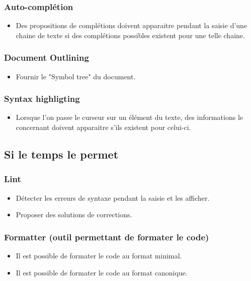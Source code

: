 \documentclass[
    iict, %
    il, %
]{heig-tb}
\begin{document}
\subsubsection*{Auto-complétion}
\begin{itemize}
    \item Des propositions de complétions doivent apparaitre pendant la saisie d’une chaine de texte si des complétions possibles existent pour une telle chaine.
\end{itemize}

\subsubsection*{Document Outlining}
\begin{itemize}
    \item Fournir le "Symbol tree" du document.
\end{itemize}

\subsubsection*{Syntax highligting}
\begin{itemize}
    \item Lorsque l’on passe le curseur sur un élément du texte, des informations le concernant doivent apparaitre s’ils existent pour celui-ci.
\end{itemize}

\subsection*{Si le temps le permet}

\subsubsection*{Lint}
\begin{itemize}
    \item Détecter les erreurs de syntaxe pendant la saisie et les afficher.
    \item Proposer des solutions de corrections.
\end{itemize}

\subsubsection*{Formatter (outil permettant de formater le code)}
\begin{itemize}
    \item Il est possible de formater le code au format minimal.
    \item Il est possible de formater le code au format canonique.
\end{itemize}
\end{document}
